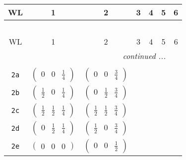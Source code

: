 \documentclass[fleqn,9pt,landscape]{jsarticle}
\begin{document}
\begin{center}
\renewcommand{\arraystretch}{1.2}
\begin{longtable}{ccccccc}
 \hline \hline
WL & 1 & 2 & 3 & 4 & 5 & 6 \\ \hline \endfirsthead

\multicolumn{6}{l}{\tablename\ \thetable{}} \\
 \hline \hline
WL & 1 & 2 & 3 & 4 & 5 & 6 \\ \hline \endhead

 \hline \hline
\multicolumn{6}{r}{\footnotesize\it continued ...} \\ \endfoot

 \hline \hline
\multicolumn{6}{r}{} \\ \endlastfoot

{\tt 2a} & $ \begin{pmatrix} 0 & 0 & \frac{1}{4} \end{pmatrix} $ & $ \begin{pmatrix} 0 & 0 & \frac{3}{4} \end{pmatrix} $ & $  $ & $  $ & $  $ & $  $ \\ \hline
{\tt 2b} & $ \begin{pmatrix} \frac{1}{2} & 0 & \frac{1}{4} \end{pmatrix} $ & $ \begin{pmatrix} 0 & \frac{1}{2} & \frac{3}{4} \end{pmatrix} $ & $  $ & $  $ & $  $ & $  $ \\ \hline
{\tt 2c} & $ \begin{pmatrix} \frac{1}{2} & \frac{1}{2} & \frac{1}{4} \end{pmatrix} $ & $ \begin{pmatrix} \frac{1}{2} & \frac{1}{2} & \frac{3}{4} \end{pmatrix} $ & $  $ & $  $ & $  $ & $  $ \\ \hline
{\tt 2d} & $ \begin{pmatrix} 0 & \frac{1}{2} & \frac{1}{4} \end{pmatrix} $ & $ \begin{pmatrix} \frac{1}{2} & 0 & \frac{3}{4} \end{pmatrix} $ & $  $ & $  $ & $  $ & $  $ \\ \hline
{\tt 2e} & $ \begin{pmatrix} 0 & 0 & 0 \end{pmatrix} $ & $ \begin{pmatrix} 0 & 0 & \frac{1}{2} \end{pmatrix} $ & $  $ & $  $ & $  $ & $  $ \\ \hline

\end{longtable}
\end{center}
\end{document}
